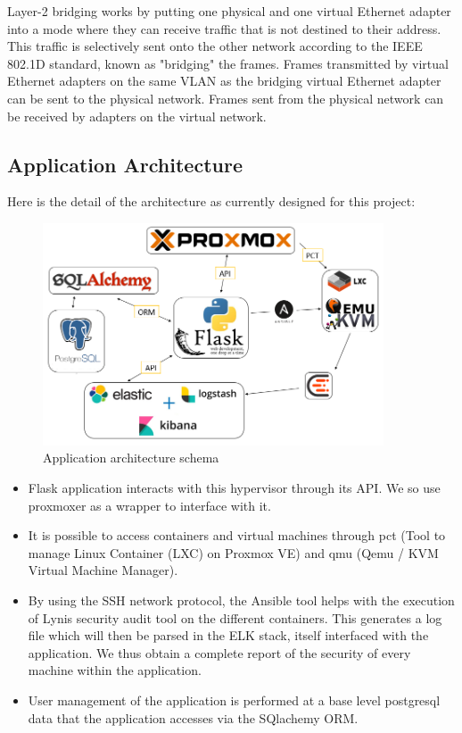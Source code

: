 Layer-2 bridging works by putting one physical and one virtual Ethernet adapter into a mode where they can receive traffic that is not destined to their address. This traffic is selectively sent onto the other network according to the IEEE 802.1D standard, known as "bridging" the frames. Frames transmitted by virtual Ethernet adapters on the same VLAN as the bridging virtual Ethernet adapter can be sent to the physical network. Frames sent from the physical network can be received by adapters on the virtual network.

\pagebreak

\subsection{Application Architecture}

Here is the detail of the architecture as currently designed for this project:
\vspace{1cm}

\begin{figure}[!h]
  \centering
  \includegraphics[width=0.90\textwidth]{images/schema.png}
  \caption{Application architecture schema}
  \label{ArchitectureSchema}
\end{figure}

\begin{itemize}
\item
  Flask application interacts with this hypervisor through its API. We
  so use proxmoxer as a wrapper to interface with
  it.
\item
  It is possible to access containers and virtual machines through
  pct (Tool to manage Linux Container (LXC) on Proxmox VE) and
  qmu (Qemu / KVM Virtual Machine Manager).
\item
  By using the SSH network protocol, the Ansible tool helps with the execution of
  Lynis security audit tool on the different containers. This generates a
  log file which will then be parsed in the ELK stack, itself
  interfaced with the application. We thus obtain a complete report of the
  security of every machine within the application.
\item
  User management of the application is performed at a base level
  postgresql data that the application accesses via the SQlachemy ORM.
\end{itemize}


